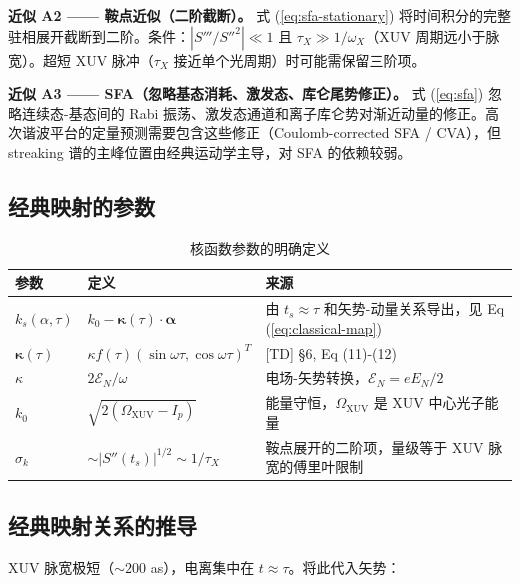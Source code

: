 \documentclass[12pt,a4paper]{ctexart}
\begin{document}
\begin{approxbox}
\textbf{近似 A2 —— 鞍点近似（二阶截断）。} 式 (\ref{eq:sfa-stationary}) 将时间积分的完整驻相展开截断到二阶。条件：$|S'''/S''^2| \ll 1$ 且 $\tau_X \gg 1/\omega_X$（XUV 周期远小于脉宽）。超短 XUV 脉冲（$\tau_X$ 接近单个光周期）时可能需保留三阶项。
\end{approxbox}

\begin{approxbox}
\textbf{近似 A3 —— SFA（忽略基态消耗、激发态、库仑尾势修正）。} 式 (\ref{eq:sfa}) 忽略连续态-基态间的 Rabi 振荡、激发态通道和离子库仑势对渐近动量的修正。高次谐波平台的定量预测需要包含这些修正（Coulomb-corrected SFA / CVA），但 streaking 谱的主峰位置由经典运动学主导，对 SFA 的依赖较弱。
\end{approxbox}

\subsection{经典映射的参数}

\begin{table}[h]
\centering
\caption{核函数参数的明确定义}
\label{tab:kernel-params}
\begin{tabular}{p{2.5cm}p{4cm}p{6cm}}
\toprule
\textbf{参数} & \textbf{定义} & \textbf{来源} \\
\midrule
$k_s(\alpha,\tau)$ & $k_0 - \boldsymbol{\kappa}(\tau)\!\cdot\!\boldsymbol{\alpha}$ & 由 $t_s\approx\tau$ 和矢势-动量关系导出，见 Eq (\ref{eq:classical-map}) \\
$\boldsymbol{\kappa}(\tau)$ & $\kappa f(\tau)(\sin\omega\tau,\cos\omega\tau)^T$ & [TD] §6, Eq (11)-(12) \\
$\kappa$ & $2\mathcal{E}_N/\omega$ & 电场-矢势转换，$\mathcal{E}_N = eE_N/2$ \\
$k_0$ & $\sqrt{2(\Omega_{\text{XUV}}-I_p)}$ & 能量守恒，$\Omega_{\text{XUV}}$ 是 XUV 中心光子能量 \\
$\sigma_k$ & $\sim |S''(t_s)|^{1/2} \sim 1/\tau_X$ & 鞍点展开的二阶项，量级等于 XUV 脉宽的傅里叶限制 \\
\bottomrule
\end{tabular}
\end{table}

\subsection{经典映射关系的推导}

XUV 脉宽极短（$\sim 200$ as），电离集中在 $t \approx \tau$。将此代入矢势：
\end{document}
